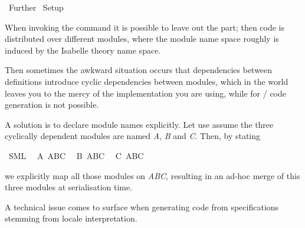 %
\begin{isabellebody}%
\def\isabellecontext{Further}%
%
\isadelimtheory
%
\endisadelimtheory
%
\isatagtheory
{}\isamarkupfalse%
\ Further\isanewline
{}\ Setup\isanewline
{}%
\endisatagtheory
{\isafoldtheory}%
%
\isadelimtheory
%
\endisadelimtheory
%
\isamarkuptrue%
%
\isamarkuptrue%
%
\begin{isamarkuptext}%
When invoking the \hyperlink{command.export-code}{\mbox{}} command it is possible to leave
  out the \hyperlink{keyword.module-name}{\mbox{}} part;  then code is distributed over
  different modules, where the module name space roughly is induced
  by the Isabelle theory name space.

  Then sometimes the awkward situation occurs that dependencies between
  definitions introduce cyclic dependencies between modules, which in the
   world leaves you to the mercy of the  implementation
  you are using,  while for / code generation is not possible.

  A solution is to declare module names explicitly.
  Let use assume the three cyclically dependent
  modules are named \emph{A}, \emph{B} and \emph{C}.
  Then, by stating%
\end{isamarkuptext}%
\isamarkuptrue%
%
\isadelimquote
%
\endisadelimquote
%
\isatagquote
{}\isamarkupfalse%
\ SML\isanewline
\ \ A\ ABC\isanewline
\ \ B\ ABC\isanewline
\ \ C\ ABC%
\endisatagquote
{\isafoldquote}%
%
\isadelimquote
%
\endisadelimquote
%
\begin{isamarkuptext}%
\noindent
  we explicitly map all those modules on \emph{ABC},
  resulting in an ad-hoc merge of this three modules
  at serialisation time.%
\end{isamarkuptext}%
\isamarkuptrue%
%
\isamarkuptrue%
%
\begin{isamarkuptext}%
A technical issue comes to surface when generating code from
  specifications stemming from locale interpretation.


\end{isamarkuptext}
\end{isabellebody}
